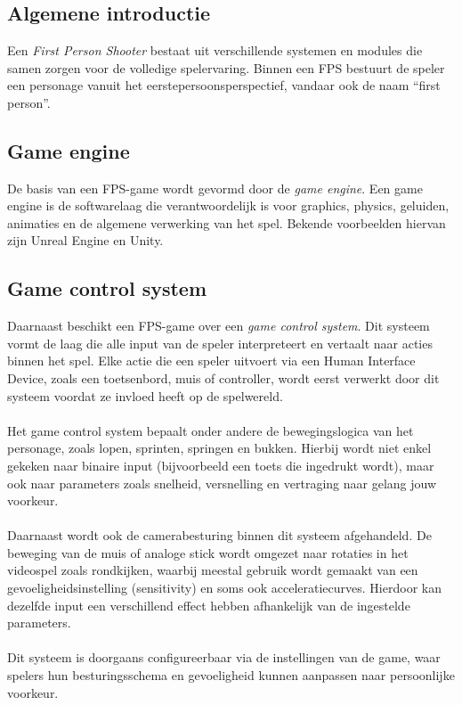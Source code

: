 \chapter{}
\label{ch:Vaktermen-binnen-een-First-Person-Shooter}

\section{Algemene introductie}
Een \textit{First Person Shooter} bestaat uit verschillende systemen en modules die samen zorgen voor de volledige spelervaring. Binnen een FPS bestuurt de speler een personage vanuit het eerstepersoonsperspectief, vandaar ook de naam ``first person''.

\section{Game engine}
De basis van een FPS-game wordt gevormd door de \textit{game engine}. Een game engine is de softwarelaag die verantwoordelijk is voor graphics, physics, geluiden, animaties en de algemene verwerking van het spel. Bekende voorbeelden hiervan zijn Unreal Engine en Unity.

\section{Game control system}
Daarnaast beschikt een FPS-game over een \textit{game control system}. Dit systeem vormt de laag die alle input van de speler interpreteert en vertaalt naar acties binnen het spel. Elke actie die een speler uitvoert via een Human Interface Device, zoals een toetsenbord, muis of controller, wordt eerst verwerkt door dit systeem voordat ze invloed heeft op de spelwereld.
\\\\
Het game control system bepaalt onder andere de bewegingslogica van het personage, zoals lopen, sprinten, springen en bukken. Hierbij wordt niet enkel gekeken naar binaire input (bijvoorbeeld een toets die ingedrukt wordt), maar ook naar parameters zoals snelheid, versnelling en vertraging naar gelang jouw voorkeur.
\\\\
Daarnaast wordt ook de camerabesturing binnen dit systeem afgehandeld. De beweging van de muis of analoge stick wordt omgezet naar rotaties in het videospel zoals rondkijken, waarbij meestal gebruik wordt gemaakt van een gevoeligheidsinstelling (sensitivity) en soms ook acceleratiecurves. Hierdoor kan dezelfde input een verschillend effect hebben afhankelijk van de ingestelde parameters.
\\\\
Dit systeem is doorgaans configureerbaar via de instellingen van de game, waar spelers hun besturingsschema en gevoeligheid kunnen aanpassen naar persoonlijke voorkeur.

